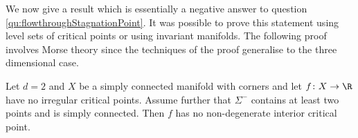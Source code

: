 We now give a result which is essentially a negative answer to question \ref{qu:flowthroughStagnationPoint}.
It was possible to prove this statement using level sets of critical points or using invariant manifolds.
The following proof involves Morse theory since the techniques of the proof generalise to the three dimensional case.
\begin{proposition}[Negative answer to question \ref{qu:flowthroughStagnationPoint} in $d=2$ dimensions]\label{pr:n2_negativeResult}
  Let $d=2$ and $X$ be a simply connected manifold with corners and let $f\colon X\to\R$ have no irregular critical points.
  Assume further that $\Sigma^-$ contains at least two points and is simply connected. Then $f$ has no non-degenerate interior critical point.
\end{proposition}

